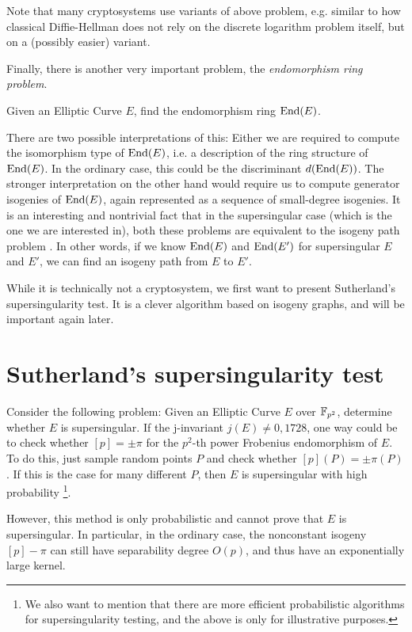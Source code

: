Note that many cryptosystems use variants of above problem, e.g. similar to how classical Diffie-Hellman does not rely on the discrete logarithm problem itself, but on a (possibly easier) variant.

Finally, there is another very important problem, the \emph{endomorphism ring problem}.
\begin{problem}
    Given an Elliptic Curve $E$, find the endomorphism ring $\mathrm{End}(E)$.
\end{problem}
There are two possible interpretations of this:
Either we are required to compute the isomorphism type of $\mathrm{End}(E)$, i.e. a description of the ring structure of $\mathrm{End}(E)$.
In the ordinary case, this could be the discriminant $d(\mathrm{End}(E))$.
The stronger interpretation on the other hand would require us to compute generator isogenies of $\mathrm{End}(E)$, again represented as a sequence of small-degree isogenies.
It is an interesting and nontrivial fact that in the supersingular case (which is the one we are interested in), both these problems are equivalent to the isogeny path problem \cite{endomorphism_ring_isogeny_path_equivalent}.
In other words, if we know $\mathrm{End}(E)$ and $\mathrm{End}(E')$ for supersingular $E$ and $E'$, we can find an isogeny path from $E$ to $E'$.

While it is technically not a cryptosystem, we first want to present Sutherland's supersingularity test.
It is a clever algorithm based on isogeny graphs, and will be important again later.

\section{Sutherland's supersingularity test}
\label{sec:sutherlands_supersingularity_test}
Consider the following problem: Given an Elliptic Curve $E$ over $\mathbb{F}_{p^2}$, determine whether $E$ is supersingular.
If the j-invariant $j(E) \neq 0, 1728$, one way could be to check whether $[p] = \pm \pi$ for the $p^2$-th power Frobenius endomorphism of $E$.
To do this, just sample random points $P$ and check whether $[p](P) = \pm \pi(P)$.
If this is the case for many different $P$, then $E$ is supersingular with high probability
\footnote{We also want to mention that there are more efficient probabilistic algorithms for supersingularity testing, and the above is only for illustrative purposes.}.

However, this method is only probabilistic and cannot prove that $E$ is supersingular.
In particular, in the ordinary case, the nonconstant isogeny $[p] - \pi$ can still have separability degree $O(p)$, and thus have an exponentially large kernel.

